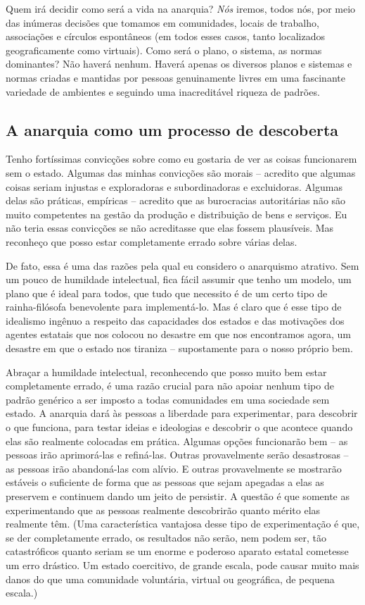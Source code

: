 Quem irá decidir como será a vida na anarquia? \emph{Nós} iremos, todos nós, por meio das inúmeras decisões que tomamos em comunidades, locais de trabalho, associações e círculos espontâneos (em todos esses casos, tanto localizados geograficamente como virtuais). Como será o plano, o sistema, as normas dominantes? Não haverá nenhum. Haverá apenas os diversos planos e sistemas e normas criadas e mantidas por pessoas genuinamente livres em uma fascinante variedade de ambientes e seguindo uma inacreditável riqueza de padrões.

\subsection*{A anarquia como um processo de descoberta}

Tenho fortíssimas convicções sobre como eu gostaria de ver as coisas funcionarem sem o estado. Algumas das minhas convicções são morais -- acredito que algumas coisas seriam injustas e exploradoras e subordinadoras e excluidoras. Algumas delas são práticas, empíricas -- acredito que as burocracias autoritárias não são muito competentes na gestão da produção e distribuição de bens e serviços. Eu não teria essas convicções se não acreditasse que elas fossem plausíveis. Mas reconheço que posso estar completamente errado sobre várias delas.

De fato, essa é uma das razões pela qual eu considero o anarquismo atrativo. Sem um pouco de humildade intelectual, fica fácil assumir que tenho um modelo, um plano que é ideal para todos, que tudo que necessito é de um certo tipo de rainha-filósofa benevolente para implementá-lo. Mas é claro que é esse tipo de idealismo ingênuo a respeito das capacidades dos estados e das motivações dos agentes estatais que nos colocou no desastre em que nos encontramos agora, um desastre em que o estado nos tiraniza -- supostamente para o nosso próprio bem.

Abraçar a humildade intelectual, reconhecendo que posso muito bem estar completamente errado, é uma razão crucial para não apoiar nenhum tipo de padrão genérico a ser imposto a todas comunidades em uma sociedade sem estado. A anarquia dará às pessoas a liberdade para experimentar, para descobrir o que funciona, para testar ideias e ideologias e descobrir o que acontece quando elas são realmente colocadas em prática. Algumas opções funcionarão bem -- as pessoas irão aprimorá-las e refiná-las. Outras provavelmente serão desastrosas -- as pessoas irão abandoná-las com alívio. E outras provavelmente se mostrarão estáveis o suficiente de forma que as pessoas que sejam apegadas a elas as preservem e continuem dando um jeito de persistir. A questão é que somente as experimentando que as pessoas realmente descobrirão quanto mérito elas realmente têm. (Uma característica vantajosa desse tipo de experimentação é que, se der completamente errado, os resultados não serão, nem podem ser, tão catastróficos quanto seriam se um enorme e poderoso aparato estatal cometesse um erro drástico. Um estado coercitivo, de grande escala, pode causar muito mais danos do que uma comunidade voluntária, virtual ou geográfica, de pequena escala.)

